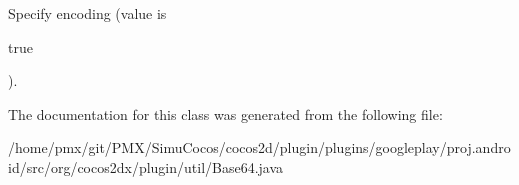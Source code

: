 Specify encoding (value is
\begin{DoxyCode}
\textcolor{keyword}{true} 
\end{DoxyCode}
 ). 

The documentation for this class was generated from the following file\+:\begin{DoxyCompactItemize}
\item 
/home/pmx/git/\+P\+M\+X/\+Simu\+Cocos/cocos2d/plugin/plugins/googleplay/proj.\+android/src/org/cocos2dx/plugin/util/Base64.\+java\end{DoxyCompactItemize}
